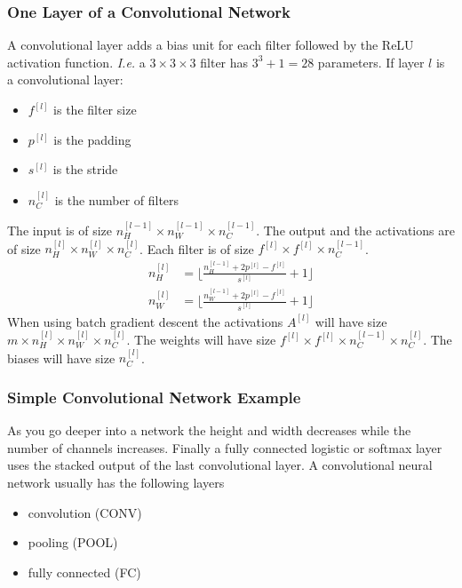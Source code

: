 \documentclass{article}
\begin{document}
\subsubsection{One Layer of a Convolutional Network}
A convolutional layer adds a bias unit for each filter followed by the ReLU activation function.
\emph{I.e.} a $3\times 3\times 3$ filter has $3^3+1=28$ parameters.
If layer $l$ is a convolutional layer:
\begin{itemize}
  \item $f^{[l]}$ is the filter size
  \item $p^{[l]}$ is the padding
  \item $s^{[l]}$ is the stride
  \item $n^{[l]}_C$ is the number of filters
\end{itemize}
The input is of size $n^{[l-1]}_H\times n^{[l-1]}_W\times n^{[l-1]}_C$.
The output and the activations are of size $n^{[l]}_H\times n^{[l]}_W\times n^{[l]}_C$.
Each filter is of size $f^{[l]}\times f^{[l]}\times n^{[l-1]}_C$.
\begin{equation}
  \begin{split}
    n^{[l]}_H&=\lfloor\frac{n^{[l-1]}_H+2p^{[l]}-f^{[l]}}{s^{[l]}}+1\rfloor\\
    n^{[l]}_W&=\lfloor\frac{n^{[l-1]}_W+2p^{[l]}-f^{[l]}}{s^{[l]}}+1\rfloor
  \end{split}
\end{equation}
When using batch gradient descent the activations $A^{[l]}$ will have size
$m\times n^{[l]}_H\times n^{[l]}_W\times n^{[l]}_C$.
The weights will have size $f^{[l]}\times f^{[l]}\times n^{[l-1]}_C\times n^{[l]}_C$.
The biases will have size $n^{[l]}_C$.

\subsubsection{Simple Convolutional Network Example}
As you go deeper into a network the height and width decreases while the number of channels increases.
Finally a fully connected logistic or softmax layer uses the stacked output of the last convolutional layer.
A convolutional neural network usually has the following layers
\begin{itemize}
  \item convolution (CONV)
  \item pooling (POOL)
  \item fully connected (FC)
\end{itemize}
\end{document}
